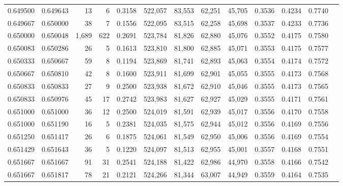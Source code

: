 \begin{tabular}{rrrrrrrrrrrrr}
0.649500 & 0.649643 &    13 &   6 &                                     0.3158 & 522,057 &  83,553 &  62,251 &  45,705 & 0.3536 & 0.4234 & 0.7740 \\
0.649667 & 0.650000 &    38 &   7 &                                     0.1556 & 522,095 &  83,515 &  62,258 &  45,698 & 0.3537 & 0.4233 & 0.7736 \\
0.650000 & 0.650048 & 1,689 & 622 &                                     0.2691 & 523,784 &  81,826 &  62,880 &  45,076 & 0.3552 & 0.4175 & 0.7580 \\
0.650083 & 0.650286 &    26 &   5 &                                     0.1613 & 523,810 &  81,800 &  62,885 &  45,071 & 0.3553 & 0.4175 & 0.7577 \\
0.650333 & 0.650667 &    59 &   8 &                                     0.1194 & 523,869 &  81,741 &  62,893 &  45,063 & 0.3554 & 0.4174 & 0.7572 \\
0.650667 & 0.650810 &    42 &   8 &                                     0.1600 & 523,911 &  81,699 &  62,901 &  45,055 & 0.3555 & 0.4173 & 0.7568 \\
0.650833 & 0.650833 &    27 &   9 &                                     0.2500 & 523,938 &  81,672 &  62,910 &  45,046 & 0.3555 & 0.4173 & 0.7565 \\
0.650833 & 0.650976 &    45 &  17 &                                     0.2742 & 523,983 &  81,627 &  62,927 &  45,029 & 0.3555 & 0.4171 & 0.7561 \\
0.651000 & 0.651000 &    36 &  12 &                                     0.2500 & 524,019 &  81,591 &  62,939 &  45,017 & 0.3556 & 0.4170 & 0.7558 \\
0.651000 & 0.651190 &    16 &   5 &                                     0.2381 & 524,035 &  81,575 &  62,944 &  45,012 & 0.3556 & 0.4169 & 0.7556 \\
0.651250 & 0.651417 &    26 &   6 &                                     0.1875 & 524,061 &  81,549 &  62,950 &  45,006 & 0.3556 & 0.4169 & 0.7554 \\
0.651429 & 0.651643 &    36 &   5 &                                     0.1220 & 524,097 &  81,513 &  62,955 &  45,001 & 0.3557 & 0.4168 & 0.7551 \\
0.651667 & 0.651667 &    91 &  31 &                                     0.2541 & 524,188 &  81,422 &  62,986 &  44,970 & 0.3558 & 0.4166 & 0.7542 \\
0.651667 & 0.651817 &    78 &  21 &                                     0.2121 & 524,266 &  81,344 &  63,007 &  44,949 & 0.3559 & 0.4164 & 0.7535 \\

\end{tabular}
